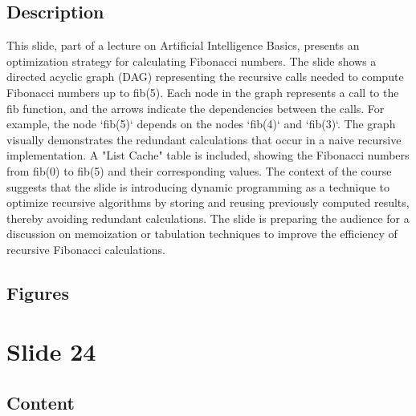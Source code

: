 \documentclass{article}%
\begin{document}
\subsection{Description}%
This slide, part of a lecture on Artificial Intelligence Basics, presents an optimization strategy for calculating Fibonacci numbers.  The slide shows a directed acyclic graph (DAG) representing the recursive calls needed to compute Fibonacci numbers up to fib(5).  Each node in the graph represents a call to the fib function, and the arrows indicate the dependencies between the calls.  For example, the node `fib(5)` depends on the nodes `fib(4)` and `fib(3)`.  The graph visually demonstrates the redundant calculations that occur in a naive recursive implementation.  A "List Cache" table is included, showing the Fibonacci numbers from fib(0) to fib(5) and their corresponding values.  The context of the course suggests that the slide is introducing dynamic programming as a technique to optimize recursive algorithms by storing and reusing previously computed results, thereby avoiding redundant calculations.  The slide is preparing the audience for a discussion on memoization or tabulation techniques to improve the efficiency of recursive Fibonacci calculations.%
\subsection{Figures}%
\begin{figure}[H]%
\centering%
\end{figure}

%
\newpage%
\section{Slide 24}%
\label{sec:Slide24}%
\subsection{Content}%
\end{document}
